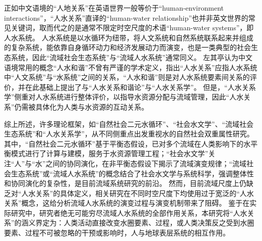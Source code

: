 正如中文语境的“人地关系”在英语世界一般等价于“human-environment interactions”\cite{li2016c, liu2023}，“人\textendash{}水关系”直译的“human-water relationship”也并非英文世界的常见关键词，取而代之的是通常不限定时空尺度的术语“human-water systems”，即人\textendash{}水系统\cite{konar2019}。
人\textendash{}水系统是以水循环为纽带，将人文系统和自然系统联系起来并组成的复杂系统，能依靠自身循环动力和经济发展动力而演变\cite{zuo2007}，也是一类典型的社会\textendash{}生态系统，因此“流域社会\textendash{}生态系统”与“流域人\textendash{}水系统”通常同义\cite{yu2020}。
左其亭认为中文语境常用的概念“人水和谐”不曾有严谨的学术定义\cite{zuo2007}，指出“人\textendash{}水关系”应指人\textendash{}水系统中“人文系统”与“水系统”之间的关系，“人水和谐”则是对人\textendash{}水系统要素间关系的评价，并在此基础上提出了与“人\textendash{}水关系和谐论”与“人\textendash{}水关系学”\cite{zuoqiting2022, zuo2016a}。
但是，“人\textendash{}水关系学”侧重对人\textendash{}水系统进行整体评价，以指导水资源分配与流域管理，因此“人\textendash{}水关系”仍需被具体化为人类与水资源的互动关系\cite{zuo2016, zuo2020a}。

综上所述，许多理论框架，如“自然\textendash{}社会二元水循环”、“社会水文学”、“流域社会\textendash{}生态系统”和“人\textendash{}水关系学”，从不同侧重点出发重视水的自然\textendash{}社会双重属性研究。
其中，“自然\textendash{}社会二元水循环”基于平衡态假设，已对多个流域在人类影响下的水平衡模式进行了计算与建模，服务于水资源管理工程；“社会水文学”关注“人”与“水”之间的协同演化，在非平衡态假设下揭示了流域演变规律；“流域社会\textendash{}生态系统”或“流域人\textendash{}水系统”的概念结合了社会水文学与系统科学，强调整体性和协同演化的复杂性，是目前流域系统研究的前沿。
然而，目前流域尺度上仍缺乏对“人\textendash{}水关系”的具体定义，相关研究在不同时空尺度下均使用过于宽泛的“人\textendash{}水关系”概念，这给分析流域人\textendash{}水系统的演变过程与演变机制带来了阻碍。
鉴于在实际研究中，研究者绝无可能穷尽流域人\textendash{}水系统的全部作用关系，本研究将“人\textendash{}水关系”的涵义界定为：人类活动直接改变水圈要素、过程，或人类决策反之受到水圈要素、过程不可被忽略的干预或影响时，人与地球表层系统的相互作用。
